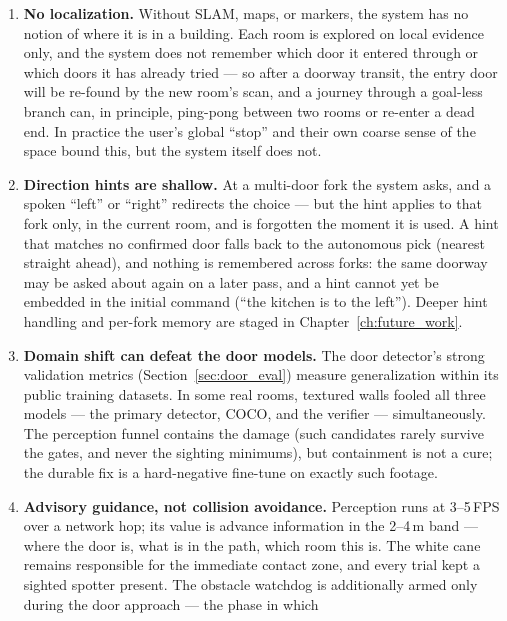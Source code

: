 \begin{enumerate}[nosep]
  \item \textbf{No localization.} Without SLAM, maps, or markers, the system has
        no notion of where it is in a building. Each room is explored on local
        evidence only, and the system does not remember which door it entered
        through or which doors it has already tried --- so after a doorway
        transit, the entry door will be re-found by the new room's scan, and a
        journey through a goal-less branch can, in principle, ping-pong between
        two rooms or re-enter a dead end. In practice the user's global ``stop''
        and their own coarse sense of the space bound this, but the system itself
        does not.
  \item \textbf{Direction hints are shallow.} At a multi-door fork the system
        asks, and a spoken ``left'' or ``right'' redirects the choice --- but the
        hint applies to that fork only, in the current room, and is forgotten the
        moment it is used. A hint that matches no confirmed door falls back to
        the autonomous pick (nearest straight ahead), and nothing is remembered
        across forks: the same doorway may be asked about again on a later pass,
        and a hint cannot yet be embedded in the initial command (``the kitchen
        is to the left''). Deeper hint handling and per-fork memory are staged in
        Chapter~\ref{ch:future_work}.
  \item \textbf{Domain shift can defeat the door models.} The door detector's
        strong validation metrics (Section~\ref{sec:door_eval}) measure
        generalization within its public training datasets. In some real rooms,
        textured walls fooled all three models --- the primary detector, COCO,
        and the verifier --- simultaneously. The perception funnel contains the
        damage (such candidates rarely survive the gates, and never the sighting
        minimums), but containment is not a cure; the durable fix is a
        hard-negative fine-tune on exactly such footage.
  \item \textbf{Advisory guidance, not collision avoidance.} Perception runs at
        3--5\,FPS over a network hop; its value is advance information in the
        2--4\,m band --- where the door is, what is in the path, which room this
        is. The white cane remains responsible for the immediate contact zone,
        and every trial kept a sighted spotter present. The obstacle watchdog is
        additionally armed only during the door approach --- the phase in which

\end{enumerate}
